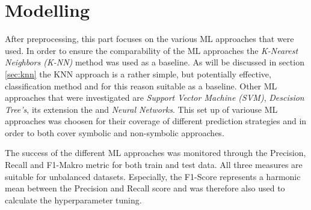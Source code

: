 \chapter{Modelling}\label{sec:data_mining}





After preprocessing, this part focuses on the various ML approaches that were used. In order to ensure the comparability of the ML approaches the \textit{K-Nearest Neighbors (K-NN)} method was used as a baseline. As will be discussed in section \ref{sec:knn} the KNN approach is a rather simple, but potentially effective, classification method and for this reason suitable as a baseline. Other ML approaches that were investigated are \textit{Support Vector Machine (SVM)}, \textit{Descision Tree's}, its extension the  and \textit{Neural Networks}. This set up of variouse ML approaches was choosen for their coverage of different prediction strategies and in order to both cover symbolic and non-symbolic approaches.

The success of the different ML approaches was monitored through the Precision, Recall and F1-Makro metric for both train and test data. All three measures are suitable for unbalanced datasets. \citep{Brownlee2020} Especially, the F1-Score represents a harmonic mean between the Precision and Recall score and was therefore also used to calculate the hyperparameter tuning.\citep{Peltarion2021}


